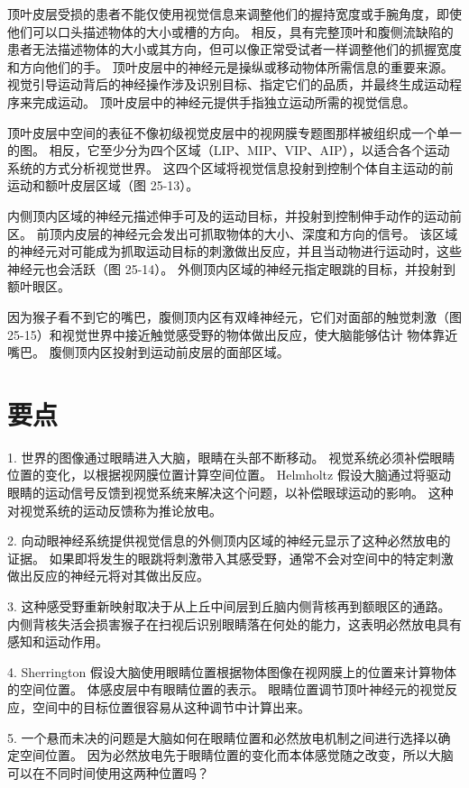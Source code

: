 顶叶皮层受损的患者不能仅使用视觉信息来调整他们的握持宽度或手腕角度，即使他们可以口头描述物体的大小或槽的方向。 相反，具有完整顶叶和腹侧流缺陷的患者无法描述物体的大小或其方向，但可以像正常受试者一样调整他们的抓握宽度和方向他们的手。 顶叶皮层中的神经元是操纵或移动物体所需信息的重要来源。 视觉引导运动背后的神经操作涉及识别目标、指定它们的品质，并最终生成运动程序来完成运动。 顶叶皮层中的神经元提供手指独立运动所需的视觉信息。

顶叶皮层中空间的表征不像初级视觉皮层中的视网膜专题图那样被组织成一个单一的图。 相反，它至少分为四个区域（LIP、MIP、VIP、AIP），以适合各个运动系统的方式分析视觉世界。 这四个区域将视觉信息投射到控制个体自主运动的前运动和额叶皮层区域（图 25-13）。

内侧顶内区域的神经元描述伸手可及的运动目标，并投射到控制伸手动作的运动前区。 前顶内皮层的神经元会发出可抓取物体的大小、深度和方向的信号。 该区域的神经元对可能成为抓取运动目标的刺激做出反应，并且当动物进行运动时，这些神经元也会活跃（图 25-14）。 外侧顶内区域的神经元指定眼跳的目标，并投射到额叶眼区。

因为猴子看不到它的嘴巴，腹侧顶内区有双峰神经元，它们对面部的触觉刺激（图 25-15）和视觉世界中接近触觉感受野的物体做出反应，使大脑能够估计 物体靠近嘴巴。 腹侧顶内区投射到运动前皮层的面部区域。




\section{要点}
1. 世界的图像通过眼睛进入大脑，眼睛在头部不断移动。 视觉系统必须补偿眼睛位置的变化，以根据视网膜位置计算空间位置。 Helmholtz 假设大脑通过将驱动眼睛的运动信号反馈到视觉系统来解决这个问题，以补偿眼球运动的影响。 这种对视觉系统的运动反馈称为推论放电。 

2. 向动眼神经系统提供视觉信息的外侧顶内区域的神经元显示了这种必然放电的证据。 如果即将发生的眼跳将刺激带入其感受野，通常不会对空间中的特定刺激做出反应的神经元将对其做出反应。 

3. 这种感受野重新映射取决于从上丘中间层到丘脑内侧背核再到额眼区的通路。 内侧背核失活会损害猴子在扫视后识别眼睛落在何处的能力，这表明必然放电具有感知和运动作用。 

4. Sherrington 假设大脑使用眼睛位置根据物体图像在视网膜上的位置来计算物体的空间位置。 体感皮层中有眼睛位置的表示。 眼睛位置调节顶叶神经元的视觉反应，空间中的目标位置很容易从这种调节中计算出来。 

5. 一个悬而未决的问题是大脑如何在眼睛位置和必然放电机制之间进行选择以确定空间位置。 因为必然放电先于眼睛位置的变化而本体感觉随之改变，所以大脑可以在不同时间使用这两种位置吗？ 

